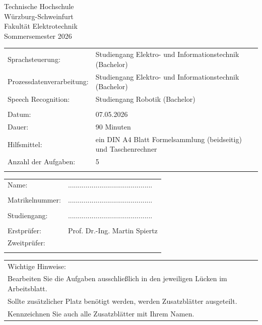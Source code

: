 \documentclass[12pt]{exam}
\begin{document}
\begin {center}
Technische Hochschule\\
Würzburg-Schweinfurt \\
Fakultät Elektrotechnik\\
Sommersemester 2026 \\
\end{center}

\begin{tabular}{ll}
Sprachsteuerung:& Studiengang Elektro- und Informationstechnik (Bachelor) \\
Prozessdatenverarbeitung:& Studiengang Elektro- und Informationstechnik (Bachelor) \\
Speech Recognition:& Studiengang Robotik (Bachelor) \\
&\\
Datum: & 07.05.2026 \\
Dauer: & 90 Minuten \\
Hilfsmittel: & ein DIN A4 Blatt Formelsammlung (beidseitig) und Taschenrechner \\
Anzahl der Aufgaben: & 5\\
&\\
\end{tabular}

\begin{tabular}{ll}
Name:&...........................................\\
&\\
Matrikelnummer:&...........................................\\
&\\
Studiengang:&...........................................\\
&\\
Erstprüfer:&Prof. Dr.-Ing. Martin Spiertz\\
Zweitprüfer:&\\
&\\
\end{tabular}

\begin{tabular}{l}
Wichtige Hinweise: \\
Bearbeiten Sie die Aufgaben ausschließlich in den jeweiligen Lücken im Arbeitsblatt.\\
Sollte zusätzlicher Platz benötigt werden, werden Zusatzblätter ausgeteilt.\\
Kennzeichnen Sie auch alle Zusatzblätter mit Ihrem Namen.
\end {tabular}
\end{document}
